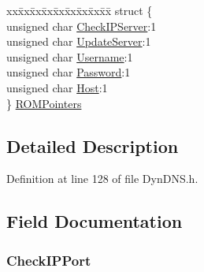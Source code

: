 \begin{DoxyCompactItemize}
\begin{tabbing}
\end{tabbing}\item 
\begin{tabbing}
xx\=xx\=xx\=xx\=xx\=xx\=xx\=xx\=xx\=\kill
struct \{\\
\>unsigned char \hyperlink{struct_d_d_n_s___p_o_i_n_t_e_r_s_a55cdb39916bdc16134b7e4dd624dde03}{CheckIPServer}:1\\
\>unsigned char \hyperlink{struct_d_d_n_s___p_o_i_n_t_e_r_s_a34435a506cc32ce707957efa77001035}{UpdateServer}:1\\
\>unsigned char \hyperlink{struct_d_d_n_s___p_o_i_n_t_e_r_s_a7892428b189b5a1d1a9fc8a3d8a30529}{Username}:1\\
\>unsigned char \hyperlink{struct_d_d_n_s___p_o_i_n_t_e_r_s_aaddd3a697b2d443ac1db7b2ec8b01e84}{Password}:1\\
\>unsigned char \hyperlink{struct_d_d_n_s___p_o_i_n_t_e_r_s_af0bd90fcfc3b55b51ca4d32c16dc1398}{Host}:1\\
\} \hyperlink{struct_d_d_n_s___p_o_i_n_t_e_r_s_a41fc47b412c63f3e2539addf52704adb}{ROMPointers}\\

\end{tabbing}\end{DoxyCompactItemize}


\subsection{Detailed Description}


Definition at line 128 of file Dyn\+D\+N\+S.\+h.



\subsection{Field Documentation}
\hypertarget{struct_d_d_n_s___p_o_i_n_t_e_r_s_af193117e65e79fc5b2276d5a87eeebb7}{}
\subsubsection[{Check\+I\+P\+Port}]{ Check\+I\+P\+Port}\label{struct_d_d_n_s___p_o_i_n_t_e_r_s_af193117e65e79fc5b2276d5a87eeebb7}


